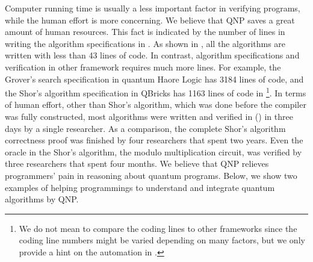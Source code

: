 Computer running time is usually a less important factor in verifying programs, while the human effort is more concerning. We believe that QNP saves a great amount of human resources. This fact is indicated by the number of lines in writing the algorithm specifications in \qafny. As shown in , all the algorithms are written with less than 43 lines of code.
In contrast, algorithm specifications and verification in other framework requires much more lines.
For example, the Grover's search specification in quantum Haore Logic \cite{qhoreusage} has 3184 lines of code, and the Shor's algorithm specification in QBricks \cite{qbricks} has 1163 lines of code in  \footnote{We do not mean to compare the coding lines to other frameworks since the coding line numbers might be varied depending on many factors, but we only provide a hint on the automation in \qafny.}.
In terms of human effort, other than Shor's algorithm, which was done before the \qafny compiler was fully constructed, most algorithms were written and verified in \qafny () in three days by a single researcher. 
As a comparison, the complete Shor's algorithm correctness proof \cite{shorsprove} was finished by four researchers that spent two years. Even the oracle in the Shor's algorithm, the modulo multiplication circuit, was verified by three researchers that spent four months. We believe that QNP relieves programmers' pain in reasoning about quantum programs.
Below, we show two examples of helping programmings to understand and integrate quantum algorithms by QNP.


